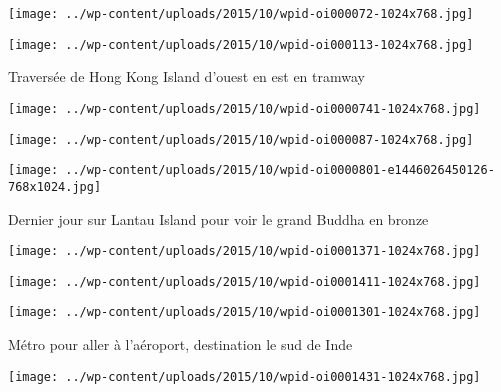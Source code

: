  

\begin{center} \texttt{[image: ../wp-content/uploads/2015/10/wpid-oi000072-1024x768.jpg]} \end{center}

 

 

\begin{center} \texttt{[image: ../wp-content/uploads/2015/10/wpid-oi000113-1024x768.jpg]} \end{center}

 

 Traversée de Hong Kong Island d'ouest en est en tramway 

 

\begin{center} \texttt{[image: ../wp-content/uploads/2015/10/wpid-oi0000741-1024x768.jpg]} \end{center}

 

 

\begin{center} \texttt{[image: ../wp-content/uploads/2015/10/wpid-oi000087-1024x768.jpg]} \end{center}

 

 

\begin{center} \texttt{[image: ../wp-content/uploads/2015/10/wpid-oi0000801-e1446026450126-768x1024.jpg]} \end{center}

 

 Dernier jour sur Lantau Island pour voir le grand Buddha en bronze 

 

\begin{center} \texttt{[image: ../wp-content/uploads/2015/10/wpid-oi0001371-1024x768.jpg]} \end{center}

 

 

\begin{center} \texttt{[image: ../wp-content/uploads/2015/10/wpid-oi0001411-1024x768.jpg]} \end{center}

 

 

\begin{center} \texttt{[image: ../wp-content/uploads/2015/10/wpid-oi0001301-1024x768.jpg]} \end{center}

 

 Métro pour aller à l'aéroport, destination le sud de Inde 

 

\begin{center} \texttt{[image: ../wp-content/uploads/2015/10/wpid-oi0001431-1024x768.jpg]} \end{center}




 
 
